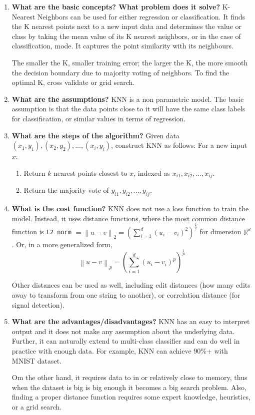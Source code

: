 \documentclass{article}
\begin{document}
\begin{enumerate}
    \item \textbf{What are the basic concepts? What problem does it solve?}
    \noindent 
    \smallbreak
    K-Nearest Neighbors can be used for either regression or classification. It finds the K nearest points next to a new input data and determines the value or class by taking the mean value of its K nearest neighbors, or in the case of classification, mode. It captures the point similarity with its neighbours.
    
    The smaller the K, smaller training error; the larger the K, the more smooth the decision boundary due to majority voting of neighbors. To find the optimal K, cross validate or grid search.

    \item \textbf{What are the assumptions?}
    \noindent 
    \smallbreak
    KNN is a non parametric model. The basic assumption is that the data points close to it will have the same class labels for classification, or similar values in terms of regression.
    
    \item \textbf{What are the steps of the algorithm?}
    \noindent 
    \smallbreak
    Given data $(x_1, y_1), (x_2, y_2), ..., (x_i, y_i)$, construct KNN as follows:
    For a new input $x$:
    \begin{enumerate}
        \item Return $k$ nearest points closest to $x$, indexed as $x_{i1}, x_{i2}, ..., x_{ij}$.
        \item Return the majority vote of $y_{i1}, y_{i2}, ..., y_{ij}$.
    \end{enumerate}
    
    \item \textbf{What is the cost function?}
    \noindent 
    \smallbreak
    KNN does not use a loss function to train the model. Instead, it uses distance functions, where the most common distance function is \verb|L2 norm| $= \left\|u - v\right\|_2 = (\sum_{i=1}^{d}(u_i - v_i)^{2})^\frac{1}{2}$ for dimension $\mathbb{R}^d$. Or, in a more generalized form,\\
    $$\left\|u - v\right\|_p = (\sum_{i=1}^{d}(u_i - v_i)^{p})^\frac{1}{p}$$
    
    Other distances can be used as well, including edit distances (how many edits away to transform from one string to another), or correlation distance (for signal detection).
    
    \item \textbf{What are the advantages/disadvantages?}
    \noindent 
    \smallbreak
    KNN has an easy to interpret output and it does not make any assumption about the underlying data. Further, it can naturally extend to multi-class classifier and can do well in practice with enough data. For example, KNN can achieve 90\%+ with MNIST dataset.
    
    Om the other hand, it requires data to in or relatively close to memory, thus when the dataset is big is big enough it becomes a big search problem. Also, finding a proper distance function requires some expert knowledge, heuristics, or a grid search.
\end{enumerate}
\end{document}

